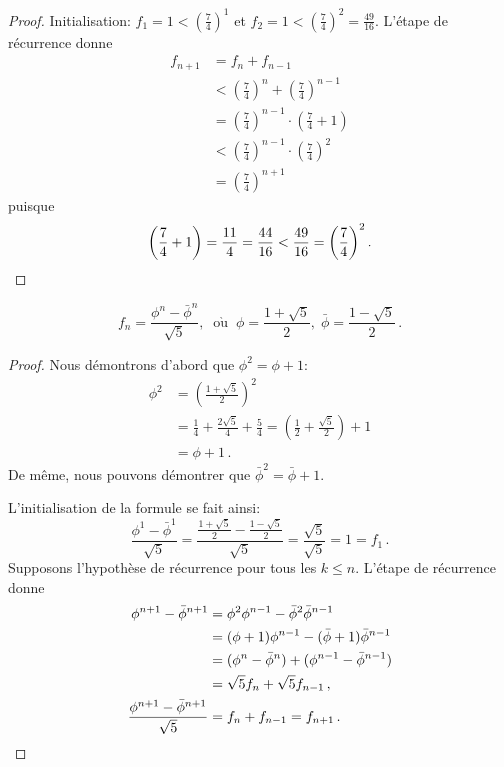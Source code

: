 \begin{proof}
Initialisation: $f_1=1<\left(\displaystyle\frac{7}{4}\right)^1$ et $f_2=1<\left(\displaystyle\frac{7}{4}\right)^2=\displaystyle\frac{49}{16}$. L'étape de récurrence donne 
\begin{align*}
f_{n+1}&=f_n+f_{n-1}\\
&<\left(\frac{7}{4}\right)^n + \left(\frac{7}{4}\right)^{n-1}\\
&=\left(\frac{7}{4}\right)^{n-1}\cdot\left(\frac{7}{4}+1\right)\\
&<\left(\frac{7}{4}\right)^{n-1}\cdot\left(\frac{7}{4}\right)^2\\
&=\left(\frac{7}{4}\right)^{n+1}
\end{align*}
puisque
\[
\left(\frac{7}{4}+1\right) = \frac{11}{4} = \frac{44}{16}<\frac{49}{16}=\left(\frac{7}{4}\right)^2.
\qedhere\]
\end{proof}


\begin{theorem}

\begin{displaymath}
f_n = \frac{\phi^n - \bar{\phi}^n}{\sqrt{5}}, \;\; \mathrm{o\grave{u}} \;\;
\phi = \frac{1+\sqrt{5}}{2},\;\bar{\phi} = \frac{1-\sqrt{5}}{2}\,.
\end{displaymath}
\end{theorem}

\begin{proof}
Nous démontrons d'abord que $\phi^2=\phi+1$:
\begin{align*}
\phi^2 &= \left(\frac{1+\sqrt{5}}{2}\right)^2\\
&= \frac{1}{4} + \frac{2\sqrt{5}}{4} + \frac{5}{4}= \left(\frac{1}{2} + \frac{\sqrt{5}}{2}\right) + 1\\
&=\phi + 1\,.
\end{align*}
De même, nous pouvons démontrer que $\bar{\phi}^2=\bar{\phi}+1$.

L'initialisation de la formule se fait ainsi:
\[
\frac{\phi^1 - \bar{\phi}^1}{\sqrt{5}}=\frac{\frac{1+\sqrt{5}}{2}-\frac{1-\sqrt{5}}{2}}{\sqrt{5}}=\frac{\sqrt{5}}{\sqrt{5}}=1=f_1\,.
\]
Supposons l'hypothèse de récurrence pour tous les $k\leq n$. L'étape de récurrence donne
\begin{align*}
\phi^{n+1} - \bar{\phi}^{n+1} &= \phi^2\phi^{n-1} - \bar{\phi}^2\bar{\phi}^{n-1}\\
&=(\phi+1)\phi^{n-1} - (\bar{\phi}+1)\bar{\phi}^{n-1}\\
&=(\phi^{n} - \bar{\phi}^{n}) + (\phi^{n-1} - \bar{\phi}^{n-1})\\
&=\sqrt{5}f_{n} + \sqrt{5}f_{n-1}\,,\\
\frac{\phi^{n+1} - \bar{\phi}^{n+1}}{\sqrt{5}} &= f_{n} + f_{n-1} = f_{n+1}\,.\qedhere
\end{align*}
\end{proof}

